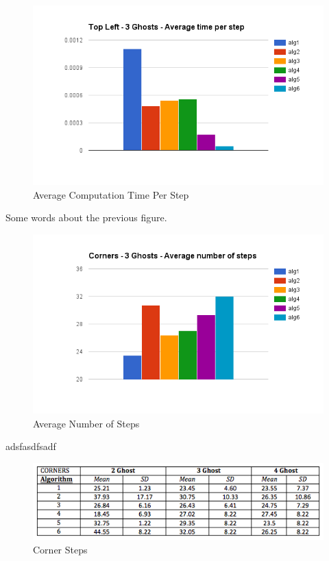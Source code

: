 \documentclass[11pt]{article}
\begin{document}
\begin{multicols}{2}
\begin{figure}[H]
	\includegraphics[width=\columnwidth]{time.png}
	\caption{Average Computation Time Per Step}
	\label{fig:averagecomputation}
\end{figure}	

Some words about the previous figure. 

\begin{figure}[H]
	\includegraphics[width=\columnwidth]{cornersteps.png}
	\caption{Average Number of Steps}
	\label{fig:averagenumsteps}
\end{figure}

adsfasdfsadf

\end{multicols}


\begin{figure}[H]
	\includegraphics[width=\textwidth]{CornersScore.png}
	\caption{Corner Steps}
\end{figure}
\end{document}
